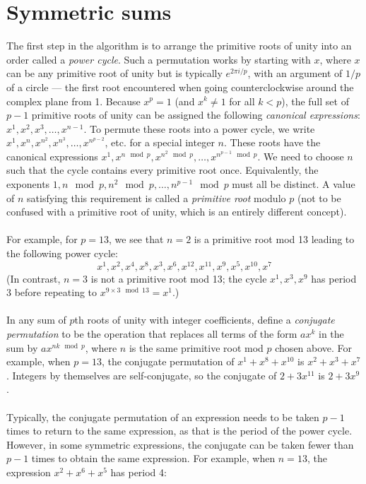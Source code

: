 \documentclass{article}
\begin{document}
\section{Symmetric sums}
    The first step in the algorithm is to arrange the primitive roots of unity into an order called a \textit{power cycle}. Such a permutation works by starting with $ x $, where $ x $ can be any primitive root of unity but is typically $ e^{2\pi i/p} $, with an argument of $ 1/p $ of a circle --- the first root encountered when going counterclockwise around the complex plane from 1. Because $ x^p = 1 $ (and $ x^k \ne 1 $ for all $ k < p $), the full set of $ p - 1 $ primitive roots of unity can be assigned the following \textit{canonical expressions}: $ x^1, x^2, x^3, \dots, x^{n - 1} $. To permute these roots into a power cycle, we write $ x^1, x^n, x^{n^2}, x^{n^3}, \dots, x^{n^{p - 2}} $, etc. for a special integer $ n $. These roots have the canonical expressions $ x^1, x^{n \mod p}, x^{n^2 \mod p}, \dots, x^{n^{p - 1} \mod p} $. We need to choose $ n $ such that the cycle contains every primitive root once. Equivalently, the exponents $ 1, n \mod p, n^2 \mod p, \dots, n^{p - 1} \mod p $ must all be distinct. A value of $ n $ satisfying this requirement is called a \textit{primitive root} modulo $ p $ (not to be confused with a primitive root of unity, which is an entirely different concept).\\
    \\
    For example, for $ p = 13 $, we see that $ n = 2 $ is a primitive root mod 13 leading to the following power cycle:
    $$ x^1, x^2, x^4, x^8, x^3, x^6, x^{12}, x^{11}, x^9, x^5, x^{10}, x^7 $$
    (In contrast, $ n = 3 $ is not a primitive root mod 13; the cycle $ x^1, x^3, x^9 $ has period 3 before repeating to $ x^{9 \times 3 \mod 13} = x^1 $.)\\
    \\
    In any sum of $ p $th roots of unity with integer coefficients, define a \textit{conjugate permutation} to be the operation that replaces all terms of the form $ ax^k $ in the sum by $ ax^{nk \mod p} $, where $ n $ is the same primitive root mod $ p $ chosen above. For example, when $ p = 13 $, the conjugate permutation of $ x^1 + x^8 + x^{10} $ is $ x^2 + x^3 + x^7 $. Integers by themselves are self-conjugate, so the conjugate of $ 2 + 3x^{11} $ is $ 2 + 3x^9 $.\\
    \\
    Typically, the conjugate permutation of an expression needs to be taken $ p - 1 $ times to return to the same expression, as that is the period of the power cycle. However, in some symmetric expressions, the conjugate can be taken fewer than $ p - 1 $ times to obtain the same expression. For example, when $ n = 13 $, the expression $ x^2 + x^6 + x^5 $ has period 4:
\end{document}
